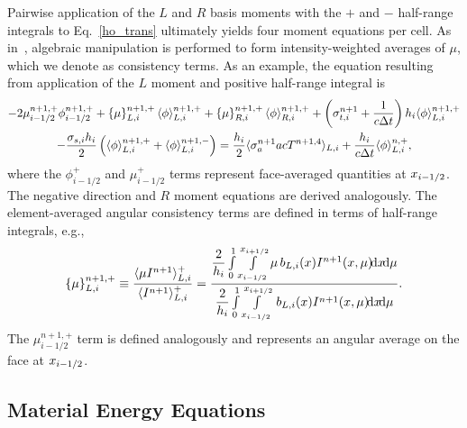 Pairwise application of the $L$ and $R$ basis
moments with the $+$ and $-$ half-range integrals to Eq.~\eqref{ho_trans} 
ultimately yields four moment
equations per cell. As in~\cite{wolters}, algebraic manipulation is performed to form
intensity-weighted
averages of $\mu$, which we denote as consistency terms.  As an example, the equation resulting from application of the $L$ moment and
positive half-range integral is
\begin{multline}\label{lo_tran}
    -2{\mu}_{i-1/2}^{n+1,+} \phi_{i-1/2}^{n+1,+} + \left\{ \mu \right\}_{L,i}^{n+1,+}
  \langle \phi \rangle_{L,i}^{n+1,+}
  +  \left\{ \mu \right\}_{R,i}^{n+1,+}
  \langle \phi \rangle_{R,i}^{n+1,+} +  \left(\sigma_{t,i}^{n+1}+\frac{1}{c \Delta t} \right) h_i 
  \langle \phi \rangle_{L,i}^{n+1,+} \\-  \frac{\sigma_{s,i} h_i}{2} \left( \langle \phi \rangle_{L,i}^{n+1,+} +
  \langle \phi \rangle_{L,i}^{n+1,-}\right) = \frac{h_i}{2} \langle \sigma_a^{n+1} a c T^{n+1,4} \rangle_{L,i} +
  \frac{h_i}{c\Delta t}\langle \phi \rangle_{L,i}^{n,+},
\end{multline}
where the $\phi^+_{i-1/2}$ and $\mu^+_{i-1/2}$ terms represent face-averaged quantities at $x_{{i-1/2}}$.  The negative direction and $R$ moment equations are
derived analogously.  The element-averaged angular consistency terms are defined in terms of half-range integrals, e.g.,
\begin{equation}\label{const}
    \left\{ {\mu} \right\}_{L,i}^{n+1,+} \equiv \frac{\langle \mu I^{n+1} \rangle_{L,i}^+}{\langle I^{n+1} \rangle_{L,i}^+} =  \frac{
{\displaystyle \frac{2}{h_i}} \int\limits_0^1 \int\limits_{x_{i-1/2}}^{x_{i+1/2}} \mu \, b_{L,i}(x)
I^{n+1}(x,\mu) \!\mathrm{d} x \!\mathrm{d} \mu } 
{{\displaystyle \frac{2}{h_i}} \int\limits_0^1 \int\limits_{x_{i-1/2}}^{x_{i+1/2}} \, b_{L,i}(x)
I^{n+1}(x,\mu) \!\mathrm{d} x \!\mathrm{d} \mu } .
\end{equation}
The $\mu_{i-1/2}^{n+1,+}$ term is defined analogously and represents an angular average on the face at $x_{{i-1/2}}$.

\subsection{Material Energy Equations}

